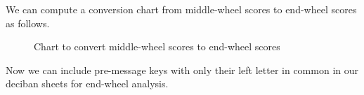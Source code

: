 \noindent We can compute a conversion chart from middle-wheel
scores to end-wheel scores as follows.
\begin{figure}[H]
  \begin{center}
  \end{center}
  \caption{Chart to convert middle-wheel scores to end-wheel scores}
\end{figure}
\noindent Now we can include pre-message keys with only their left
letter in common in our deciban sheets for end-wheel analysis.
